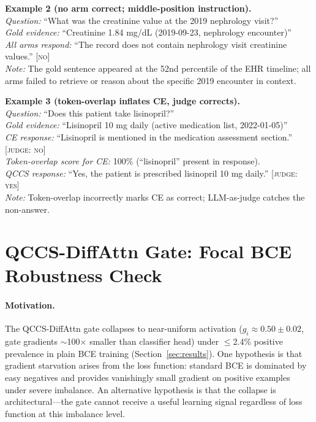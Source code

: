 \documentclass{article}
\begin{document}
\noindent\textbf{Example 2 (no arm correct; middle-position instruction).}\\
\textit{Question:} ``What was the creatinine value at the 2019 nephrology visit?''\\
\textit{Gold evidence:} ``Creatinine 1.84 mg/dL (2019-09-23, nephrology encounter)''\\
\textit{All arms respond:} ``The record does not contain nephrology visit creatinine values.'' \textsc{[no]}\\
\textit{Note:} The gold sentence appeared at the 52nd percentile of the EHR timeline;
all arms failed to retrieve or reason about the specific 2019 encounter in context.

\noindent\textbf{Example 3 (token-overlap inflates CE, judge corrects).}\\
\textit{Question:} ``Does this patient take lisinopril?''\\
\textit{Gold evidence:} ``Lisinopril 10 mg daily (active medication list, 2022-01-05)''\\
\textit{CE response:} ``Lisinopril is mentioned in the medication assessment section.'' \textsc{[judge: no]}\\
\textit{Token-overlap score for CE:} 100\% (``lisinopril'' present in response).\\
\textit{QCCS response:} ``Yes, the patient is prescribed lisinopril 10 mg daily.'' \textsc{[judge: yes]}\\
\textit{Note:} Token-overlap incorrectly marks CE as correct; LLM-as-judge catches the non-answer.


\section{QCCS-DiffAttn Gate: Focal BCE Robustness Check}
\label{app:focal}

\paragraph{Motivation.}
The QCCS-DiffAttn gate collapses to near-uniform activation
($g_i \approx 0.50 \pm 0.02$, gate gradients $\sim$100$\times$ smaller
than classifier head) under $\leq$2.4\% positive prevalence in plain BCE
training (Section~\ref{sec:results}). One hypothesis is that gradient
starvation arises from the loss function: standard BCE is dominated by
easy negatives and provides vanishingly small gradient on positive examples
under severe imbalance. An alternative hypothesis is that the collapse is
architectural---the gate cannot receive a useful learning signal regardless
of loss function at this imbalance level.
\end{document}
